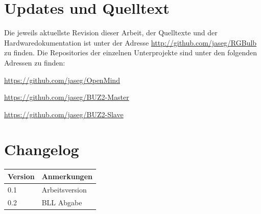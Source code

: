 \documentclass[12pt,a4paper,notitlepage]{article}
\begin{document}
\section{Updates und Quelltext}
\begin{center}

\begin{minipage}{11cm}
\begin{center}
\sffamily%
\vspace{2mm}
Die jeweils aktuellste Revision dieser Arbeit, der Quelltexte und der Hardwaredokumentation ist unter der Adresse 
\url{http://github.com/jaseg/RGBulb} zu finden. Die Repositories der einzelnen Unterprojekte sind unter den folgenden Adressen zu finden:
\begin{description}
\item \url{https://github.com/jaseg/OpenMind}
\item \url{https://github.com/jaseg/BUZ2-Master}
\item \url{https://github.com/jaseg/BUZ2-Slave}
\end{description}
\vspace{2mm}
\end{center}
\end{minipage}

\end{center}
\section{Changelog}
\begin{tabularx}{\textwidth}{l|l}
\textbf{Version}&\textbf{Anmerkungen}\\\hline
0.1&Arbeitsversion\\
0.2&BLL Abgabe
\end{tabularx}
\end{document}

